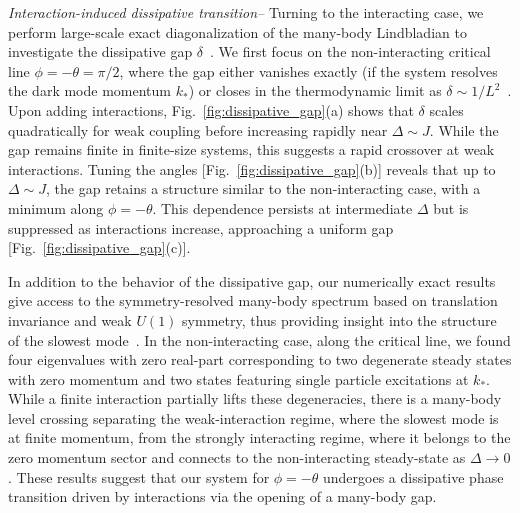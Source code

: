 \documentclass[floatfix,reprint,amsmath,amssymb,superscriptaddress,aps,prl]{revtex4-2}
\begin{document}
\emph{Interaction-induced dissipative transition--} Turning to the interacting case, we perform large-scale exact diagonalization of the many-body Lindbladian to investigate the dissipative gap $\delta$~\cite{supplementary_mat}. We first focus on the non-interacting critical line $\phi=-\theta=\pi/2$, where the gap either vanishes exactly (if the system resolves the dark mode momentum $k_*$) or closes in the thermodynamic limit as $\delta\sim 1/L^2$~\cite{supplementary_mat}. Upon adding interactions, Fig.~\ref{fig:dissipative_gap}(a) shows that $\delta$ scales quadratically for weak coupling before increasing rapidly near $\Delta\sim J$. While the gap remains finite in finite-size systems, this suggests a rapid crossover at weak interactions. Tuning the angles [Fig.~\ref{fig:dissipative_gap}(b)] reveals that up to $\Delta\sim J$, the gap retains a structure similar to the non-interacting case, with a minimum along $\phi=-\theta$. This dependence persists at intermediate $\Delta$ but is suppressed as interactions increase, approaching a uniform gap [Fig.~\ref{fig:dissipative_gap}(c)].

In addition to the behavior of the dissipative gap, our numerically exact results give access to the symmetry-resolved many-body spectrum based on translation invariance and weak $U(1)$ symmetry, thus providing insight into the structure of the slowest mode~\cite{supplementary_mat}. In the non-interacting case, along the critical line, we found four eigenvalues with zero real-part corresponding to two degenerate steady states with zero momentum and two states featuring single particle excitations at $k_*$. While a finite interaction partially lifts these degeneracies, there is a many-body level crossing separating the weak-interaction regime, where the slowest mode is at finite momentum, from the strongly interacting regime, where it belongs to the zero momentum sector and connects to the non-interacting steady-state as $\Delta\rightarrow0$. These results suggest that our system for $\phi=-\theta$ undergoes a dissipative phase transition driven by interactions via the opening of a many-body gap.
\end{document}
